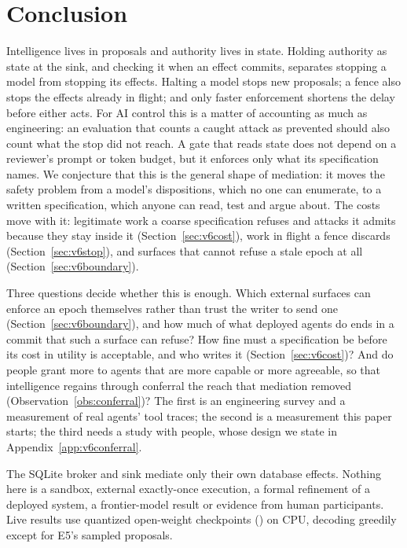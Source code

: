 \section{Conclusion}\label{sec:conclusion}

Intelligence lives in proposals and authority lives in state. Holding authority as state at the sink, and checking
it when an effect commits, separates stopping a model from stopping its effects. Halting a model stops new proposals;
a fence also stops the effects already in flight; and only faster enforcement shortens the delay before either acts. For AI control this is a matter of accounting as
much as engineering: an evaluation that counts a caught attack as prevented should also count what the stop did not
reach. A
gate that reads state does not depend on a reviewer's prompt or token budget, but it enforces only what its
specification names. We conjecture that this is the general shape of mediation: it moves the safety problem from a
model's dispositions, which no one can enumerate, to a written specification, which anyone can read, test and argue
about. The costs move with it: legitimate work a coarse specification refuses and attacks it admits because they stay
inside it (Section~\ref{sec:v6cost}), work in flight a fence discards (Section~\ref{sec:v6stop}), and surfaces that cannot refuse a stale epoch at all
(Section~\ref{sec:v6boundary}).

Three questions decide whether this is enough. Which external surfaces can enforce an epoch themselves rather than
trust the writer to send one (Section~\ref{sec:v6boundary}), and how much of what deployed agents do ends in a commit
that such a surface can refuse? How fine must a specification be before its cost in
utility is acceptable, and who writes it (Section~\ref{sec:v6cost})? And do people grant more to agents that are more
capable or more agreeable, so that intelligence regains through conferral the reach that mediation removed
(Observation~\ref{obs:conferral})? The first is an engineering survey and a measurement of real agents' tool traces; the second is a measurement this paper starts;
the third needs a study with people, whose design we state in Appendix~\ref{app:v6conferral}.

 The SQLite broker and sink mediate only their own database effects. Nothing here is a sandbox, external
exactly-once execution, a formal refinement of a deployed system, a frontier-model result or evidence from human
participants. Live results use quantized open-weight checkpoints (\vsixCheckpointList) on CPU, decoding greedily except for E5's
sampled proposals.
